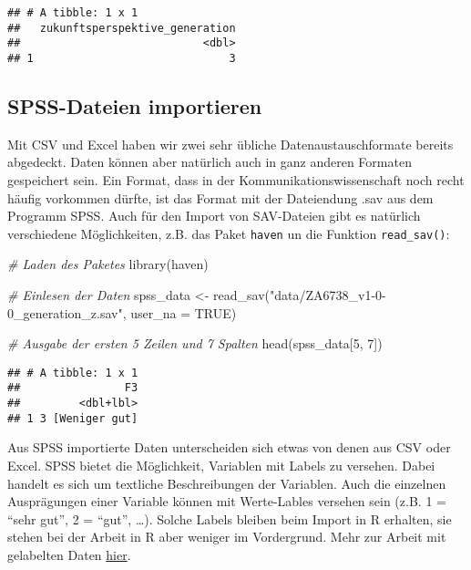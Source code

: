 \documentclass[
]{book}
\newenvironment{Shaded}{\begin{snugshade}}{\end{snugshade}}
\newcommand{\AttributeTok}[1]{\textcolor[rgb]{0.77,0.63,0.00}{#1}}
\newcommand{\CommentTok}[1]{\textcolor[rgb]{0.56,0.35,0.01}{\textit{#1}}}
\newcommand{\ConstantTok}[1]{\textcolor[rgb]{0.00,0.00,0.00}{#1}}
\newcommand{\DecValTok}[1]{\textcolor[rgb]{0.00,0.00,0.81}{#1}}
\newcommand{\FunctionTok}[1]{\textcolor[rgb]{0.00,0.00,0.00}{#1}}
\newcommand{\NormalTok}[1]{#1}
\newcommand{\OtherTok}[1]{\textcolor[rgb]{0.56,0.35,0.01}{#1}}
\newcommand{\StringTok}[1]{\textcolor[rgb]{0.31,0.60,0.02}{#1}}
\begin{document}
\begin{verbatim}
## # A tibble: 1 x 1
##   zukunftsperspektive_generation
##                            <dbl>
## 1                              3
\end{verbatim}

\hypertarget{spss-dateien-importieren}{%
\subsection{SPSS-Dateien importieren}\label{spss-dateien-importieren}}

Mit CSV und Excel haben wir zwei sehr übliche Datenaustauschformate bereits abgedeckt. Daten können aber natürlich auch in ganz anderen Formaten gespeichert sein. Ein Format, dass in der Kommunikationswissenschaft noch recht häufig vorkommen dürfte, ist das Format mit der Dateiendung .sav aus dem Programm SPSS. Auch für den Import von SAV-Dateien gibt es natürlich verschiedene Möglichkeiten, z.B. das Paket \texttt{haven} un die Funktion \texttt{read\_sav()}:

\begin{Shaded}
\begin{Highlighting}[]
\CommentTok{\# Laden des Paketes}
\FunctionTok{library}\NormalTok{(haven)}

\CommentTok{\# Einlesen der Daten}
\NormalTok{spss\_data }\OtherTok{\textless{}{-}} \FunctionTok{read\_sav}\NormalTok{(}\StringTok{"data/ZA6738\_v1{-}0{-}0\_generation\_z.sav"}\NormalTok{, }\AttributeTok{user\_na =} \ConstantTok{TRUE}\NormalTok{)}

\CommentTok{\# Ausgabe der ersten 5 Zeilen und 7 Spalten}
\FunctionTok{head}\NormalTok{(spss\_data[}\DecValTok{5}\NormalTok{, }\DecValTok{7}\NormalTok{])}
\end{Highlighting}
\end{Shaded}

\begin{verbatim}
## # A tibble: 1 x 1
##                F3
##         <dbl+lbl>
## 1 3 [Weniger gut]
\end{verbatim}

Aus SPSS importierte Daten unterscheiden sich etwas von denen aus CSV oder Excel. SPSS bietet die Möglichkeit, Variablen mit Labels zu versehen. Dabei handelt es sich um textliche Beschreibungen der Variablen. Auch die einzelnen Ausprägungen einer Variable können mit Werte-Lables versehen sein (z.B. 1 = ``sehr gut'', 2 = ``gut'', \ldots). Solche Labels bleiben beim Import in R erhalten, sie stehen bei der Arbeit in R aber weniger im Vordergrund. Mehr zur Arbeit mit gelabelten Daten \protect\hyperlink{work_labelled}{hier}.
\end{document}
